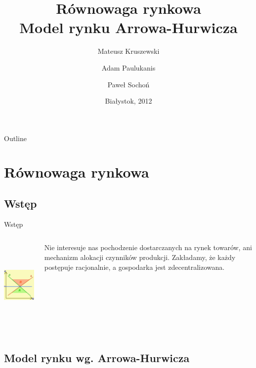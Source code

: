 \documentclass[a4paper, 11pt]{beamer}
\title[Model rynku Arrowa-Hurwicza]
{
  Równowaga rynkowa\\
  Model rynku Arrowa-Hurwicza
}
\author[Kruszewski, Paulukanis, Sochoń]
{
  Mateusz Kruszewski  \and
  Adam Paulukanis     \and
  Paweł Sochoń
}
\institute[UwB]
{
  Uniwersytet w Białymstoku
}
\date[Białystok, 2012]
{
  Białystok, 2012
}
\begin{document}
  \begin{frame}
    \titlepage
  \end{frame}

  \begin{frame}{Outline}
    \tableofcontents
  \end{frame}


  \section{Równowaga rynkowa}
    \subsection{Wstęp}

      \begin{frame}{Wstęp}
	\begin{columns}[c]
	    \includegraphics[height=4.5cm]{Price_of_market_balance.png}

	    Nie interesuje nas pochodzenie dostarczanych na rynek towarów, ani
	    mechanizm alokacji czynników produkcji. Zakładamy, że każdy postępuje
	    racjonalnie, a gospodarka jest zdecentralizowana. 
      	\end{columns}
      \end{frame}

    \subsection{Model rynku wg. Arrowa-Hurwicza}
\end{document}
